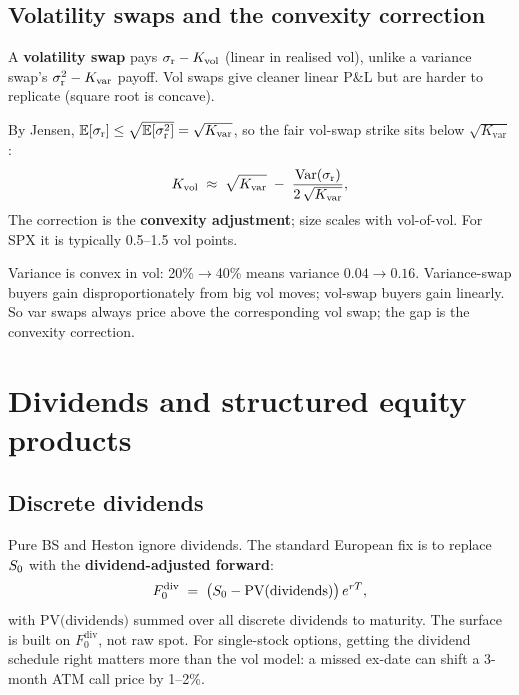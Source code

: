 \subsection{Volatility swaps and the convexity correction}
\label{subsec:volswap}

A \textbf{volatility swap} pays $\sigma_{\text{r}}-K_{\text{vol}}$
(linear in realised vol), unlike a variance swap's
$\sigma_{\text{r}}^2-K_{\text{var}}$ payoff. Vol swaps give cleaner
linear P\&L but are harder to replicate (square root is concave).

By Jensen, $\mathbb{E}[\sigma_{\text{r}}]\leq\sqrt{\mathbb{E}[\sigma_{\text{r}}^2]}
=\sqrt{K_{\text{var}}}$, so the fair vol-swap strike sits below
$\sqrt{K_{\text{var}}}$:
\begin{equation}
  K_{\text{vol}}
  \;\approx\;
  \sqrt{K_{\text{var}}}
  \;-\;
  \frac{\operatorname{Var}(\sigma_{\text{r}})}{2\,\sqrt{K_{\text{var}}}},
  \label{eq:volswap_approx}
\end{equation}
The correction is the \textbf{convexity adjustment}; size scales with
vol-of-vol. For SPX it is typically 0.5--1.5 vol points.

\begin{intuitionbox}
Variance is convex in vol: 20\%$\to$40\% means variance
$0.04\to 0.16$. Variance-swap buyers gain disproportionately from big
vol moves; vol-swap buyers gain linearly. So var swaps always price
above the corresponding vol swap; the gap is the convexity correction.
\end{intuitionbox}


\section{Dividends and structured equity products}
\label{sec:dividends_structured}

\subsection{Discrete dividends}
\label{subsec:discrete_dividends}

Pure BS and Heston ignore dividends. The standard European fix is
to replace $S_0$ with the \textbf{dividend-adjusted forward}:
\[
  F_0^{\text{div}}
  \;=\;
  \bigl(S_0 - \text{PV}(\text{dividends})\bigr)\,e^{rT},
\]
with $\text{PV(dividends)}$ summed over all discrete dividends to
maturity. The surface is built on $F_0^{\text{div}}$, not raw spot.
For single-stock options, getting the dividend schedule right matters
more than the vol model: a missed ex-date can shift a 3-month ATM
call price by 1--2\%.

